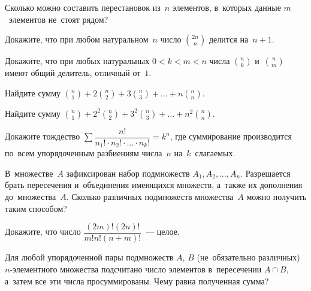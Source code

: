 \begin{problems}

\item
Сколько можно составить перестановок из~$n$ элементов, в~которых данные
$m$~элементов не~стоят рядом?

\item
Докажите, что при любом натуральном~$n$ число $\binom{2n}{n}$ делится на~$n + 1$.

\item
Докажите, что при любых натуральных $0 < k < m < n$ числа
$\binom{n}{k}$ и~$\binom{n}{m}$ имеют общий делитель, отличный от~$1$.

\item
Найдите сумму
\(
    \binom{n}{1} + 2 \binom{n}{2} + 3 \binom{n}{3}
    + \ldots +
    n \binom{n}{n}
\).

\item
Найдите сумму
\(
    \binom{n}{1} + 2^{2} \binom{n}{2} + 3^{2} \binom{n}{3}
    + \ldots +
    n^{2} \binom{n}{n}
\).

\item
Докажите тождество
\(
    \sum
        \dfrac{n!}{n_{1}! \cdot n_{2}! \cdot \ldots \cdot n_{k}!}
=
    k^{n}
\),
где суммирование производится по~всем упорядоченным разбиениям числа~$n$
на~$k$~слагаемых.

\item
В~множестве~$A$ зафиксирован набор подмножеств $A_{1}, A_{2}, \ldots, A_{n}$.
Разрешается брать пересечения и~объединения имеющихся множеств, а~также их
дополнения до~множества~$A$.
Сколько различных подмножеств множества~$A$ можно получить таким способом?

\item
Докажите, что число $\dfrac{(2m)!(2n)!}{m!n!(n+m)!}$~--- целое.

\item
Для любой упорядоченной пары подмножеств $A$, $B$ (не~обязательно различных)
$n$-эле\-ментного множества подсчитано число элементов
в~пересечении $A \cap B$, а~затем все эти числа просуммированы.
Чему равна полученная сумма?

\end{problems}

\endgroup %

